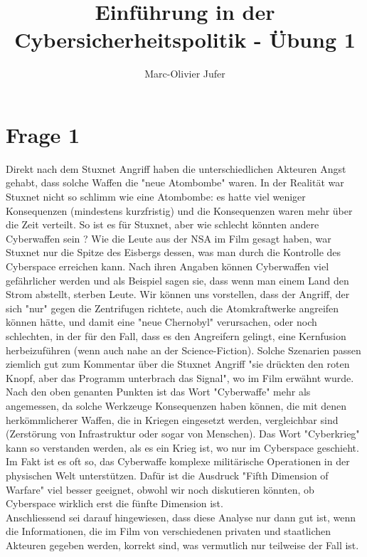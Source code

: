 \documentclass[10pt,a4paper]{article}
\author{Marc-Olivier Jufer}
\title{Einführung in der Cybersicherheitspolitik - Übung 1}
\begin{document}
	\maketitle

	\section*{Frage 1}
		Direkt nach dem Stuxnet Angriff haben die unterschiedlichen Akteuren Angst gehabt, dass solche Waffen die "neue Atombombe" waren. In der Realität war Stuxnet nicht so schlimm wie eine Atombombe: es hatte viel weniger Konsequenzen (mindestens kurzfristig) und die Konsequenzen waren mehr über die Zeit verteilt. So ist es für Stuxnet, aber wie schlecht könnten andere Cyberwaffen sein ? Wie die Leute aus der NSA im Film gesagt haben, war Stuxnet nur die Spitze des Eisbergs dessen, was man durch die Kontrolle des Cyberspace erreichen kann. Nach ihren Angaben können Cyberwaffen viel gefährlicher werden und als Beispiel sagen sie, dass wenn man einem Land den Strom abstellt, sterben Leute. Wir können uns vorstellen, dass der Angriff, der sich "nur" gegen die Zentrifugen richtete, auch die Atomkraftwerke angreifen können hätte, und damit eine "neue Chernobyl" verursachen, oder noch schlechten, in der für den Fall, dass es den Angreifern gelingt, eine Kernfusion herbeizuführen (wenn auch nahe an der Science-Fiction). Solche Szenarien passen ziemlich gut zum Kommentar über die Stuxnet Angriff "sie drückten den roten Knopf, aber das Programm unterbrach das Signal", wo im Film erwähnt wurde. \\
		
		Nach den oben genanten Punkten ist das Wort "Cyberwaffe" mehr als angemessen, da solche Werkzeuge Konsequenzen haben können, die mit denen herkömmlicherer Waffen, die in Kriegen eingesetzt werden, vergleichbar sind (Zerstörung von Infrastruktur oder sogar von Menschen). Das Wort "Cyberkrieg" kann so verstanden werden, als es ein Krieg ist, wo nur im Cyberspace geschieht. Im Fakt ist es oft so, das Cyberwaffe komplexe militärische Operationen in der physischen Welt unterstützen. Dafür ist die Ausdruck "Fifth Dimension of Warfare" viel besser geeignet, obwohl wir noch diskutieren könnten, ob Cyberspace wirklich erst die fünfte Dimension ist.\\
		
		
		Anschliessend sei darauf hingewiesen, dass diese Analyse nur dann gut ist, wenn die Informationen, die im Film von verschiedenen privaten und staatlichen Akteuren gegeben werden, korrekt sind, was vermutlich nur teilweise der Fall ist.
	
\end{document}
